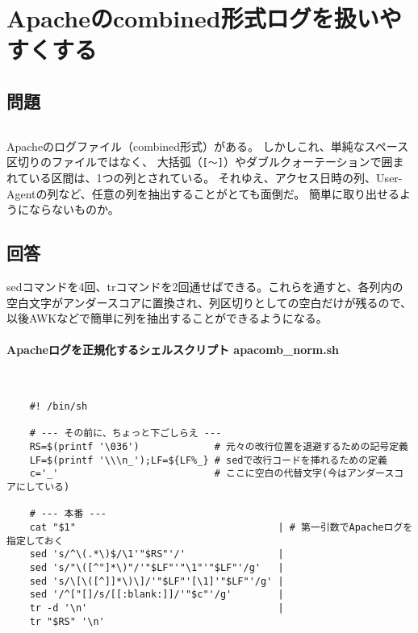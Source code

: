 \section{Apacheのcombined形式ログを扱いやすくする}

\subsection*{問題}
\noindent
$\!\!\!\!\!$
\begin{grshfboxit}{160.0mm}
	Apacheのログファイル（combined形式）がある。
	しかしこれ、単純なスペース区切りのファイルではなく、
	大括弧（\verb|[～]|）やダブルクォーテーションで囲まれている区間は、1つの列とされている。
	それゆえ、アクセス日時の列、User-Agentの列など、任意の列を抽出することがとても面倒だ。
	簡単に取り出せるようにならないものか。
\end{grshfboxit}

\subsection*{回答}
sedコマンドを4回、trコマンドを2回通せばできる。これらを通すと、各列内の空白文字がアンダースコアに置換され、列区切りとしての空白だけが残るので、以後AWKなどで簡単に列を抽出することができるようになる。

\paragraph{Apacheログを正規化するシェルスクリプト apacomb\_{}norm.sh} 　\\
\begin{frameboxit}{160.0mm}
\begin{verbatim}
	#! /bin/sh

	# --- その前に、ちょっと下ごしらえ ---
	RS=$(printf '\036')             # 元々の改行位置を退避するための記号定義
	LF=$(printf '\\\n_');LF=${LF%_} # sedで改行コードを挿れるための定義
	c='_'                           # ここに空白の代替文字(今はアンダースコアにしている)

	# --- 本番 ---
	cat "$1"                                   | # 第一引数でApacheログを指定しておく
	sed 's/^\(.*\)$/\1'"$RS"'/'                |
	sed 's/"\([^"]*\)"/'"$LF"'"\1"'"$LF"'/g'   |
	sed 's/\[\([^]]*\)\]/'"$LF"'[\1]'"$LF"'/g' |
	sed '/^["[]/s/[[:blank:]]/'"$c"'/g'        |
	tr -d '\n'                                 |
	tr "$RS" '\n'
\end{verbatim}
\end{frameboxit}


